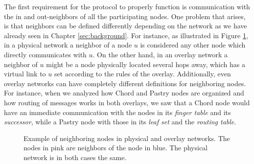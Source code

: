 \documentclass[a4paper,11pt,twoside]{report}
\begin{document}
The first requirement for the protocol to properly function is communication with the in and out-neighbors of all the participating nodes. One problem that arises, is that neighbors can be defined differently depending on the network as we have already seen in Chapter \ref{sec:background}.
For instance, as illustrated in Figure \ref{fig:different_neighbors}, in a physical network a neighbor of a node $u$ is considered any other node which directly communicates with $u$. On the other hand, in an overlay network a neighbor of $u$ might be a node physically located several hops away, which has a virtual link to $u$ set according to the rules of the overlay. Additionally, even overlay networks can have completely different definitions for neighboring nodes. For instance, when we analyzed how Chord and Pastry nodes are organized and how routing of messages works in both overlays, we saw that a Chord node would have an immediate communication with the nodes in its \textit{finger table} and its \textit{successor}, while a Pastry node with those in its \textit{leaf set} and the \textit{routing table}.\\

\begin{figure}
\centering
{}\hfill
{}
\caption{Example of neighboring nodes in physical and overlay networks. The nodes in pink are neighbors of the node in blue. The physical network is in both cases the same.}
\label{fig:different_neighbors}
\end{figure}
\end{document}
